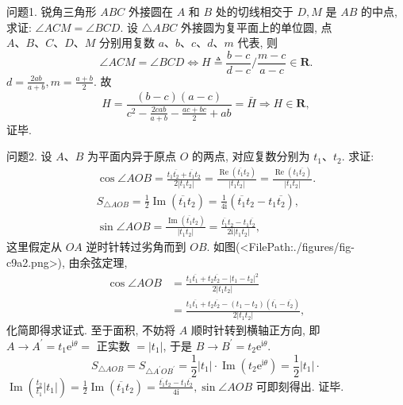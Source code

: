 
问题1. 锐角三角形 $A B C$ 外接圆在 $A$ 和 $B$ 处的切线相交于 $D, M$ 是 $A B$ 的中点, 求证: $\angle A C M=\angle B C D$.
设 $\triangle A B C$ 外接圆为复平面上的单位圆, 点 $A 、 B 、 C 、 D 、 M$ 分别用复数 $a 、 b 、 c 、 d 、 m$ 代表, 则
$$
\angle A C M=\angle B C D \Leftrightarrow H \triangleq \frac{b-c}{d-c} / \frac{m-c}{a-c} \in \mathbf{R} .
$$
$d=\frac{2 a b}{a+b}, m=\frac{a+b}{2}$. 故
$$
H=\frac{(b-c)(a-c)}{c^2-\frac{2 c a b}{a+b}-\frac{a c+b c}{2}+a b}=\bar{H} \Rightarrow H \in \mathbf{R},
$$
证毕.



问题2. 设 $A 、 B$ 为平面内异于原点 $O$ 的两点, 对应复数分别为 $t_1 、 t_2$.
求证:
$$
\begin{gathered}
\cos \angle A O B=\frac{t_1 \overline{t_2}+\overline{t_1} t_2}{2\left|t_1 t_2\right|}=\frac{\operatorname{Re}\left(\overline{t_1} t_2\right)}{\left|t_1 t_2\right|}=\frac{\operatorname{Re}\left(t_1 \overline{t_2}\right)}{\left|t_1 t_2\right|} . \\
S_{\triangle A O B}=\frac{1}{2} \operatorname{Im}\left(\overline{t_1} t_2\right)=\frac{1}{4 \mathrm{i}}\left(\overline{t_1} t_2-t_1 \overline{t_2}\right), \\
\sin \angle A O B=\frac{\operatorname{Im}\left(\overline{t_1} t_2\right)}{\left|t_1 t_2\right|}=\frac{\overline{t_1} t_2-t_1 \overline{t_2}}{2 \mathrm{i}\left|t_1 t_2\right|},
\end{gathered}
$$
这里假定从 $O A$ 逆时针转过劣角而到 $O B$.
如图(<FilePath:./figures/fig-c9a2.png>), 由余弦定理,
$$
\begin{aligned}
\cos \angle A O B & =\frac{t_1 \overline{t_1}+t_2 \overline{t_2}-\left|t_1-t_2\right|^2}{2\left|t_1 t_2\right|} \\
& =\frac{t_1 \overline{t_1}+t_2 \overline{t_2}-\left(t_1-t_2\right)\left(\overline{t_1}-\overline{t_2}\right)}{2\left|t_1 t_2\right|},
\end{aligned}
$$
化简即得求证式.
至于面积, 不妨将 $A$ 顺时针转到横轴正方向, 即 $A \rightarrow A^{\prime}=t_1 \mathrm{e}^{\mathrm{i} \theta}=$ 正实数 $=\left|t_1\right|$, 于是 $B \rightarrow B^{\prime}=t_2 \mathrm{e}^{\mathrm{i} \theta}$.
$$
S_{\triangle A O B}=S_{\triangle A^{\prime} O B^{\prime}}=\frac{1}{2}\left|t_1\right| \cdot \operatorname{Im}\left(t_2 \mathrm{e}^{\mathrm{i} \theta}\right)=\frac{1}{2}\left|t_1\right| \cdot
$$
$\operatorname{Im}\left(\frac{t_2}{t_1}\left|t_1\right|\right)=\frac{1}{2} \operatorname{Im}\left(\overline{t_1} t_2\right)=\frac{\overline{t_1} t_2-t_1 \overline{t_2}}{4 \mathrm{i}}, \sin \angle A O B$ 可即刻得出.
证毕.




